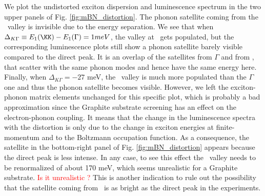 We plot the undistorted exciton dispersion and luminescence spectrum in the two upper panels of Fig. \ref{fig:mBN_distortion}. The phonon satellite coming from the \KK~valley is invisible due to the energy separation. We see that when $\Delta_{K\Gamma} \equiv E_1(\KK) - E_1(\Gamma) = 1 meV$, the valley at \KK~gets populated, but the corresponding luminescence plots still show a phonon satellite barely visible compared to the direct peak. It is an overlap of the satellites from $\Gamma$ and from \KK, that scatter with the same phonon modes and hence have the same energy here. Finally, when $\Delta_{K\Gamma} = -27$ meV, the \KK~valley is much more populated than the $\Gamma$ one and thus the phonon satellite becomes visible. However, we left the exciton-phonon matrix elements unchanged for this specific plot, which is probably a bad approximation since the Graphite substrate screening has an effect on the electron-phonon coupling.\cite{sohier2021remote} It means that the change in the luminescence spectra with the distortion is only due to the change in exciton energies at finite-momentum and to the Boltzmann occupation function. As a consequence, the satellite in the bottom-right panel of Fig. \ref{fig:mBN_distortion} appears because the direct peak is less intense. In any case, to see this effect the \KK~valley needs to be renormalized of about 170 meV, which seems unrealistic for a Graphite substrate. \textcolor{red}{Is it unrealistic ?} This is another indication to rule out the possibility that the satellite coming from \KK~is as bright as the direct peak in the experiments.

%
